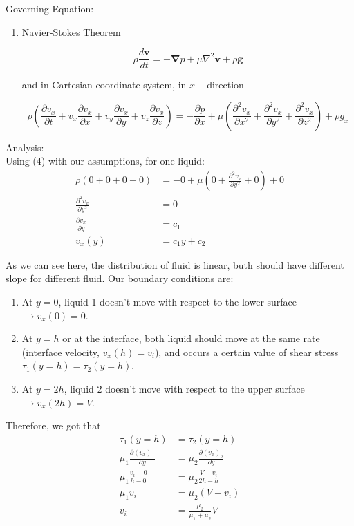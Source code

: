 \documentclass[10pt]{article}
\begin{document}
Governing Equation:
\begin{enumerate}
    \item Navier-Stokes Theorem
    
    \begin{equation}
        \rho \frac{d \mathbf{v}}{dt} = -\mathbf{\nabla}p + \mu \nabla^2 \mathbf{v} + \rho \mathbf{g}
    \end{equation}

    and in Cartesian coordinate system, in $x-$direction

    \begin{equation}
        \rho \left( \frac{\partial v_x}{\partial t} + v_x \frac{\partial v_x}{\partial x} + v_y \frac{\partial v_x}{\partial y} + v_z \frac{\partial v_x}{\partial z} \right) = -\frac{\partial p}{\partial x} + \mu \left(\frac{\partial^2 v_x}{\partial x^2} + \frac{\partial^2 v_x}{\partial y^2} + \frac{\partial^2 v_x}{\partial z^2} \right) + \rho g_x
    \end{equation}
\end{enumerate}

\hfill

Analysis: \\
Using (4) with our assumptions, for one liquid:
\begin{align*}
    \rho(0 + 0 + 0 + 0) &= -0 + \mu(0 + \frac{\partial^2 v_x}{\partial y^2} + 0) + 0 \\
    \frac{\partial^2 v_x}{\partial y^2} &= 0 \\
    \frac{\partial v_x}{\partial y} &= c_1 \\
    v_x(y) &= c_1 y + c_2
\end{align*}

As we can see here, the distribution of fluid is linear, buth should have different slope for different fluid. Our boundary conditions are:
\begin{enumerate}
    \item At $y = 0$, liquid 1 doesn't move with respect to the lower surface $\rightarrow v_x(0) = 0$.
    \item At $y = h$ or at the interface, both liquid should move at the same rate (interface velocity, $v_x(h) = v_i$), and occurs a certain value of shear stress $\tau_1 (y = h) = \tau_2(y = h)$.
    \item At $y = 2h$, liquid 2 doesn't move with respect to the upper surface $\rightarrow v_x(2h) = V$.
\end{enumerate}

Therefore, we got that
\begin{align*}
    \tau_1 (y = h) &= \tau_2 (y = h) \\
    \mu_1 \frac{\partial (v_x)_1}{\partial y} &= \mu_2 \frac{\partial (v_x)_2}{\partial y} \\
    \mu_1 \frac{v_i - 0}{h - 0} &= \mu_2 \frac{V - v_i}{2h - h} \\
    \mu_1 v_i &= \mu_2 (V - v_i) \\
    v_i &= \frac{\mu_2}{\mu_1 + \mu_2} V
\end{align*}
\end{document}
